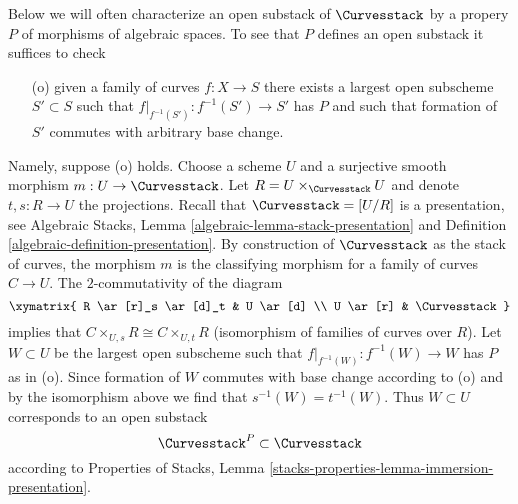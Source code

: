 \noindent
Below we will often characterize an open substack of $\Curvesstack$
by a propery $P$ of morphisms of algebraic spaces. To see that $P$
defines an open substack it suffices to check
\begin{enumerate}
\item[(o)] given a family of curves $f : X \to S$ there exists
a largest open subscheme $S' \subset S$ such that
$f|_{f^{-1}(S')} : f^{-1}(S') \to S'$ has $P$ and such that
formation of $S'$ commutes with arbitrary base change.
\end{enumerate}
Namely, suppose (o) holds. Choose a scheme $U$ and a surjective
smooth morphism $m : U \to \Curvesstack$. Let
$R = U \times_{\Curvesstack} U$ and denote $t, s : R \to U$
the projections. Recall that $\Curvesstack = [U/R]$ is a presentation,
see Algebraic Stacks, Lemma \ref{algebraic-lemma-stack-presentation} and
Definition \ref{algebraic-definition-presentation}.
By construction of $\Curvesstack$ as
the stack of curves, the morphism $m$ is the classifying morphism
for a family of curves $C \to U$. The $2$-commutativity
of the diagram
$$
\xymatrix{
R \ar[r]_s \ar[d]_t & U \ar[d] \\
U \ar[r] & \Curvesstack
}
$$
implies that $C \times_{U, s} R  \cong C \times_{U, t} R$
(isomorphism of families of curves over $R$). Let $W \subset U$
be the largest open subscheme such that
$f|_{f^{-1}(W)} : f^{-1}(W) \to W$ has $P$ as in (o).
Since formation of $W$ commutes with base change according to (o)
and by the isomorphism above we find that $s^{-1}(W) = t^{-1}(W)$.
Thus $W \subset U$ corresponds to an open substack
$$
\Curvesstack^P \subset \Curvesstack
$$
according to Properties of Stacks, Lemma
\ref{stacks-properties-lemma-immersion-presentation}.

